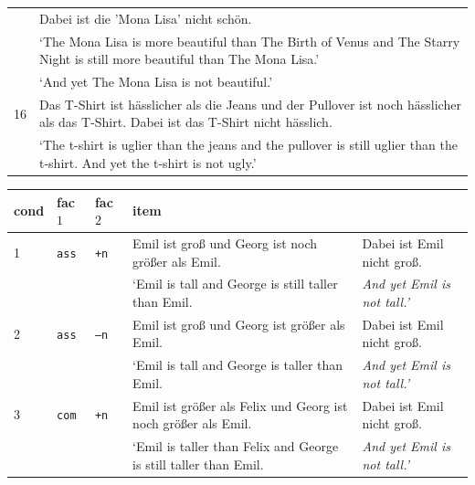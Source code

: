 \documentclass[output=paper
,modfonts
,nonflat]{langsci/langscibook}
\begin{document}
\begin{longtable}{lp{317.90625pt}}
   & Dabei ist die 'Mona Lisa' nicht schön. \\
   & {`The Mona Lisa is more beautiful than The Birth of Venus and The Starry Night is still more beautiful than The Mona Lisa.'}\\
   & {`And yet The Mona Lisa is not beautiful.'}\\
\midrule
16 & Das T-Shirt ist hässlicher als die Jeans und der Pullover ist noch hässlicher als das T-Shirt. Dabei ist das T-Shirt nicht hässlich.\\
   & {`The t-shirt is uglier than the jeans and the pullover is still uglier than the t-shirt. And yet the t-shirt is not ugly.'}\\
\end{longtable}


\begin{table}
\begin{tabular}{lllll}
\lsptoprule
cond & fac $1$ & fac $2$ & item & \\
\midrule
1 & \texttt{ass} & \texttt{\footnotesize{+}n} & Emil ist groß \hspace{25pt} und Georg ist noch größer als Emil. & Dabei ist Emil nicht groß. \\
 & & & {`Emil is tall \hspace{32pt} and George is \hspace{0.4pt} still \hspace{2pt} taller than Emil.} & \textit{And yet Emil is not tall.'} \\
\midrule
2 & \texttt{ass} & \texttt{\footnotesize{--}n} & Emil ist groß \hspace{25pt} und Georg ist \hspace{16pt} größer als Emil. & Dabei ist Emil nicht groß. \\
 & & & {`Emil is tall \hspace{32pt} and George is \hspace{19pt} taller than Emil.} & \textit{And yet Emil is not tall.'}   \\
\midrule 
3 & \texttt{com} & \texttt{\footnotesize{+}n} & Emil ist größer als Felix \hspace{0.65pt} und Georg ist noch größer als Emil. & Dabei ist Emil nicht groß.   \\
 & & & {`Emil is taller than Felix \hspace{2pt} and George is \hspace{0.4pt} still \hspace{2pt} taller than Emil.} & \textit{And yet Emil is not tall.'}  \\

\end{tabular}
\end{table}
\end{document}
